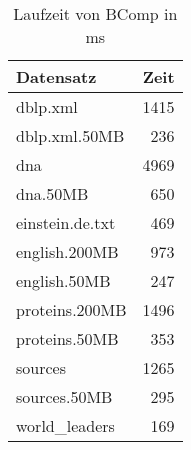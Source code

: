 \documentclass[10pt,a4paper]{standalone}
\begin{document}
	
	
	\begin{table}\centering
		\begin{tabular}{l|r}
			Datensatz & Zeit \\ \hline
          dblp.xml & 1415 \\
     dblp.xml.50MB &  236 \\
               dna & 4969 \\
          dna.50MB &  650 \\
   einstein.de.txt &  469 \\
     english.200MB &  973 \\
      english.50MB &  247 \\
    proteins.200MB & 1496 \\
     proteins.50MB &  353 \\
           sources & 1265 \\
      sources.50MB &  295 \\
    world\_leaders &  169 \\
		\end{tabular}
		\caption{Laufzeit von BComp in ms}
	\end{table}
\end{document}

